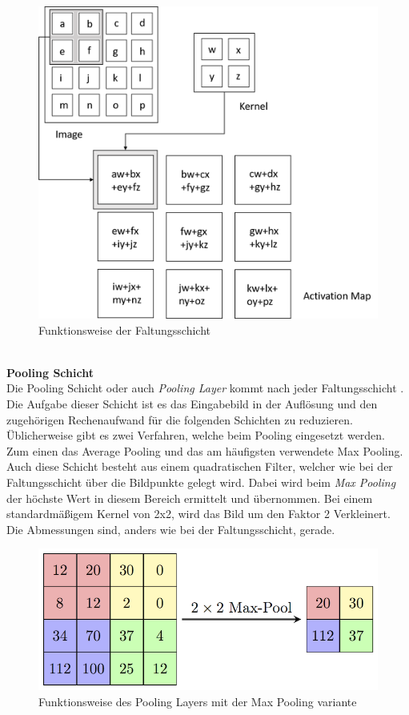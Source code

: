 \documentclass[a4paper,12pt,oneside]{article}
\begin{document}
\begin{figure}
	[h]
	\centering
	\includegraphics[scale=0.5]{Sources/CNN.png}
	\caption{Funktionsweise der Faltungsschicht \cite{convolutional2019layer}}
	\label{img:faltungsschicht}
\end{figure}\\
\textbf{Pooling Schicht}\\
Die Pooling Schicht oder auch \textit{Pooling Layer} kommt nach jeder Faltungsschicht \cite[336f.]{goodfellow2016deep}. Die Aufgabe dieser Schicht ist es das Eingabebild in der Auflösung und den zugehörigen Rechenaufwand für die folgenden Schichten zu reduzieren. Üblicherweise gibt es zwei Verfahren, welche beim Pooling eingesetzt werden. Zum einen das Average Pooling und das am häufigsten verwendete Max Pooling. Auch diese Schicht besteht aus einem quadratischen Filter, welcher wie bei der Faltungsschicht über die Bildpunkte gelegt wird. Dabei wird beim \textit{Max Pooling} der höchste Wert in diesem Bereich ermittelt und übernommen. Bei einem standardmäßigem Kernel von 2x2, wird das Bild um den Faktor 2 Verkleinert. Die Abmessungen sind, anders wie bei der Faltungsschicht, gerade.
\newpage
\begin{figure}
	[h]
	\centering
	\includegraphics[scale=2.0]{Sources/MaxpoolSample2.png}
	\caption{Funktionsweise des Pooling Layers mit der Max Pooling variante \cite{pooling2018layer}}
	\label{img:maxpooling}
\end{figure}
\end{document}
